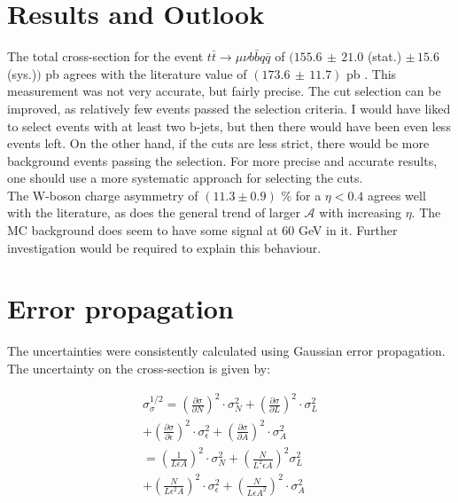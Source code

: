 \documentclass[%
 reprint,
 amsmath,amssymb,
 aps,
]{revtex4-2}
\begin{document}
\section{Results and Outlook}

The total cross-section for the event $t \bar t \rightarrow \mu \nu b \bar b q \bar q$ of 
$(155.6 \, \pm \, 21.0$ (stat.) $\pm \, 15.6$ (sys.)$)$ pb agrees with the literature value of $(173.6 \, \pm \, 11.7)$ pb \cite{workman_review_2022}. This measurement was not very accurate, but fairly precise. The cut selection can be improved, as relatively few events passed the selection criteria. I would have liked to select events with at least two b-jets, but then there would have been even less events left.
On the other hand, if the cuts are less strict, there would be more background events passing the selection. For more precise and accurate results, one should use a more systematic approach for selecting the cuts. \\
The W-boson charge asymmetry of $(11.3 \pm 0.9)$ \% for a $\eta < 0.4$ agrees well with the literature, as does the general trend of larger $\mathcal{A}$ with increasing $\eta$. The MC background does seem to have some signal at 60 GeV in it. Further investigation would be required to explain this behaviour. 








\section{Error propagation}

The uncertainties were consistently calculated using Gaussian error propagation. 
The uncertainty on the cross-section is given by:

\begin{multline}\label{eq:cross_sec_err}
    \sigma_{\sigma}^{1/2} = \left(\frac{\partial \sigma}{\partial N}\right)^2 \cdot \sigma_N^2 + \left(\frac{\partial \sigma}{\partial L}\right)^2 \cdot \sigma_L^2 \\
    + \left(\frac{\partial \sigma}{\partial \epsilon}\right)^2 \cdot \sigma_{\epsilon}^2 + \left(\frac{\partial \sigma}{\partial A}\right)^2 \cdot \sigma_A^2 \\
    = \left(\frac{1}{L \epsilon A}\right)^2 \cdot \sigma_N^2 + \left(\frac{N}{L^2 \epsilon A}\right)^2 \sigma_L^2 \\
    + \left(\frac{N}{L \epsilon^2 A}\right)^2 \cdot \sigma_{\epsilon}^2 + \left(\frac{N}{L \epsilon A^2}\right)^2 \cdot \sigma_A^2
\end{multline}
\end{document}
